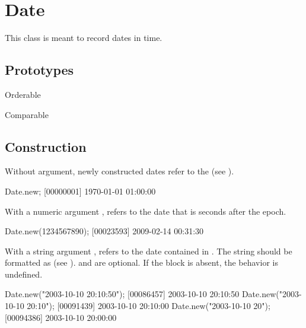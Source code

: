 
\section{Date}

This class is meant to record dates in time.  
\experimental{}

\subsection{Prototypes}
\begin{refObjects}
\item[Orderable]
\item[Comparable]
\end{refObjects}

\subsection{Construction}

Without argument, newly constructed dates refer to the 
(see ).

\begin{urbiscript}[firstnumber=1]
Date.new;
[00000001] 1970-01-01 01:00:00
\end{urbiscript}

With a numeric argument , refers to the date that is 
seconds after the epoch.

\begin{urbiscript}
Date.new(1234567890);
[00023593] 2009-02-14 00:31:30
\end{urbiscript}

With a string argument , refers to the date contained in .
The string should be formatted as  (see ). 
and  are optional. If the block 
is absent, the behavior is undefined.


\begin{urbiscript}
Date.new("2003-10-10 20:10:50");
[00086457] 2003-10-10 20:10:50
Date.new("2003-10-10 20:10");
[00091439] 2003-10-10 20:10:00
Date.new("2003-10-10 20");
[00094386] 2003-10-10 20:00:00
\end{urbiscript}

